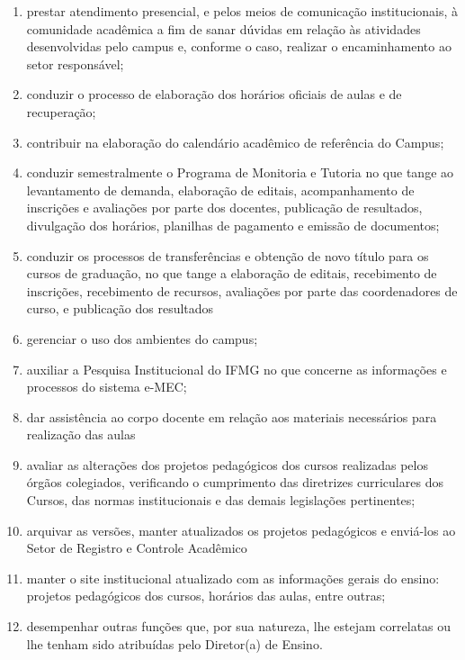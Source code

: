 \documentclass[a4paper,12pt]{report}
\begin{document}
\begin{enumerate}
\renewcommand{\labelenumi}{\Roman{enumi}}

\item prestar atendimento presencial, e pelos meios de comunicação institucionais, à  
      comunidade acadêmica a fim de sanar dúvidas em relação às atividades desenvolvidas 
      pelo campus e, conforme o caso, realizar o encaminhamento ao setor responsável;

\item conduzir o processo de elaboração dos horários oficiais de aulas e de recuperação;

\item contribuir na elaboração do calendário acadêmico de referência do Campus;

\item conduzir semestralmente o Programa de Monitoria e Tutoria no que tange ao 
      levantamento de demanda, elaboração de editais, acompanhamento de inscrições e 
      avaliações por parte dos docentes, publicação de resultados, divulgação dos 
      horários, planilhas de pagamento e emissão de documentos;
      
\item conduzir os processos de transferências e obtenção de novo título para os cursos de           
      graduação, no que tange a elaboração de editais, recebimento de inscrições,  
      recebimento de recursos, avaliações por parte das coordenadores de curso, e 
      publicação dos resultados

\item gerenciar o uso dos ambientes do campus;

\item auxiliar a Pesquisa Institucional do IFMG no que concerne as informações e processos 
      do sistema e-MEC;

\item dar assistência ao corpo docente em relação aos materiais necessários para realização 
      das aulas

\item avaliar as alterações dos projetos pedagógicos dos cursos realizadas pelos órgãos           
      colegiados, verificando o cumprimento das diretrizes curriculares dos Cursos, das 
      normas institucionais e das demais legislações pertinentes;

\item arquivar as versões, manter atualizados os projetos pedagógicos e enviá-los ao Setor 
      de Registro e Controle Acadêmico

\item manter o site institucional atualizado com as informações gerais do ensino: projetos 
      pedagógicos dos cursos, horários das aulas, entre outras;

\item desempenhar outras funções que, por sua natureza, lhe estejam correlatas ou lhe  
      tenham sido atribuídas pelo Diretor(a) de Ensino.
\end{enumerate}
\end{document}
